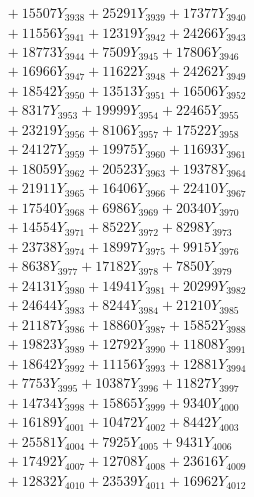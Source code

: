 \documentclass[a4paper,10pt]{article}
\begin{document}
{\begin{align}
&\;  + 15507 Y_{3938} + 25291 Y_{3939} + 17377 Y_{3940} \\[0.3ex]
&\;  + 11556 Y_{3941} + 12319 Y_{3942} + 24266 Y_{3943} \\[0.3ex]
&\;  + 18773 Y_{3944} + 7509 Y_{3945} + 17806 Y_{3946} \\[0.3ex]
&\;  + 16966 Y_{3947} + 11622 Y_{3948} + 24262 Y_{3949} \\[0.3ex]
&\;  + 18542 Y_{3950} + 13513 Y_{3951} + 16506 Y_{3952} \\[0.3ex]
&\;  + 8317 Y_{3953} + 19999 Y_{3954} + 22465 Y_{3955} \\[0.3ex]
&\;  + 23219 Y_{3956} + 8106 Y_{3957} + 17522 Y_{3958} \\[0.5ex]\allowbreak
&\;  + 24127 Y_{3959} + 19975 Y_{3960} + 11693 Y_{3961} \\[0.3ex]
&\;  + 18059 Y_{3962} + 20523 Y_{3963} + 19378 Y_{3964} \\[0.3ex]
&\;  + 21911 Y_{3965} + 16406 Y_{3966} + 22410 Y_{3967} \\[0.3ex]
&\;  + 17540 Y_{3968} + 6986 Y_{3969} + 20340 Y_{3970} \\[0.3ex]
&\;  + 14554 Y_{3971} + 8522 Y_{3972} + 8298 Y_{3973} \\[0.3ex]
&\;  + 23738 Y_{3974} + 18997 Y_{3975} + 9915 Y_{3976} \\[0.3ex]
&\;  + 8638 Y_{3977} + 17182 Y_{3978} + 7850 Y_{3979} \\[0.3ex]
&\;  + 24131 Y_{3980} + 14941 Y_{3981} + 20299 Y_{3982} \\[0.3ex]
&\;  + 24644 Y_{3983} + 8244 Y_{3984} + 21210 Y_{3985} \\[0.3ex]
&\;  + 21187 Y_{3986} + 18860 Y_{3987} + 15852 Y_{3988} \\[0.5ex]\allowbreak
&\;  + 19823 Y_{3989} + 12792 Y_{3990} + 11808 Y_{3991} \\[0.3ex]
&\;  + 18642 Y_{3992} + 11156 Y_{3993} + 12881 Y_{3994} \\[0.3ex]
&\;  + 7753 Y_{3995} + 10387 Y_{3996} + 11827 Y_{3997} \\[0.3ex]
&\;  + 14734 Y_{3998} + 15865 Y_{3999} + 9340 Y_{4000} \\[0.3ex]
&\;  + 16189 Y_{4001} + 10472 Y_{4002} + 8442 Y_{4003} \\[0.3ex]
&\;  + 25581 Y_{4004} + 7925 Y_{4005} + 9431 Y_{4006} \\[0.3ex]
&\;  + 17492 Y_{4007} + 12708 Y_{4008} + 23616 Y_{4009} \\[0.3ex]
&\;  + 12832 Y_{4010} + 23539 Y_{4011} + 16962 Y_{4012} \\[0.3ex]

\end{align}}
\end{document}
